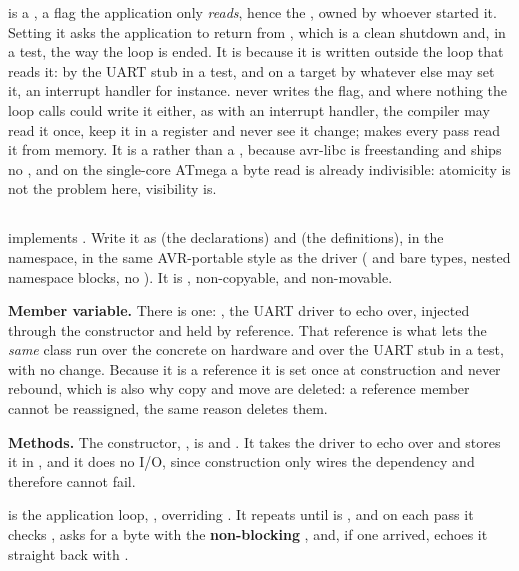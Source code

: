  is a , a flag the application only \emph{reads}, hence the
, owned by whoever started it. Setting it  asks the application to return from
, which is a clean shutdown and, in a test, the way the loop is ended. It is
 because it is written outside the loop that reads it: by the UART stub in a test,
and on a target by whatever else may set it, an interrupt handler for instance.  never
writes the flag, and where nothing the loop calls could write it either, as with an interrupt
handler, the compiler may read it once, keep it in a register and never see it change;
 makes every pass read it from memory. It is a  rather than a
, because avr-libc is freestanding and ships no , and on the
single-core ATmega a byte read is already indivisible: atomicity is not the problem here, visibility
is.

\subsection{}
\label{c10:sec:echo_class}
 implements . Write it as  (the
declarations) and  (the definitions), in the  namespace, in
the same AVR-portable style as the driver ( and bare types, nested namespace
blocks, no \code{[[nodiscard]]}). It is , non-copyable, and non-movable.

\textbf{Member variable.} There is one: , the UART driver to
echo over, injected through the constructor and held by reference. That reference is what lets the
\emph{same} class run over the concrete  on hardware and over the UART stub in a test,
with no change. Because it is a reference it is set once at construction and never rebound, which is
also why copy and move are deleted: a reference member cannot be reassigned, the same reason
 deletes them.

\textbf{Methods.} The constructor, , is
 and . It takes the driver to echo over and stores it in ,
and it does no I/O, since construction only wires the dependency and therefore cannot fail.

 is the application loop, , overriding
. It repeats until  is , and on each pass it checks
, asks  for a byte with the \textbf{non-blocking} , and, if one
arrived, echoes it straight back with .

